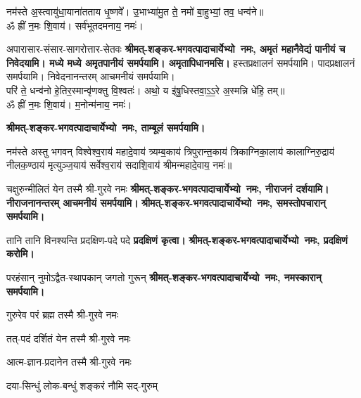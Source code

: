 \begin{center}

नम॑स्ते अ॒स्त्वायु॑धा॒याना॑तताय धृ॒ष्णवे᳚। उ॒भाभ्या॑मु॒त ते॒ नमो॑ बा॒हुभ्यां॒ तव॒ धन्व॑ने॥\\
ॐ ह्रीं न॒मः शि॒वाय॑। सर्व॑भूतदमनाय॒ नमः॑।

{अपारासार-संसार-सागरोत्तार-सेतवः}
\textbf{श्रीमत्-शङ्कर-भगवत्पादाचार्येभ्यो~नमः, अमृतं महानैवेद्यं पानीयं च निवेदयामि। मध्ये मध्ये अमृतपानीयं समर्पयामि। अमृतापिधानमसि।}
\medskip
हस्तप्रक्षालनं समर्पयामि। पादप्रक्षालनं समर्पयामि। निवेदनानन्तरम् आचमनीयं समर्पयामि।\\

परि॑ ते॒ धन्व॑नो हे॒तिर॒स्मान्वृ॑णक्तु वि॒श्वतः॑। अथो॒ य इ॑षु॒धिस्तवा॒ऽ॒ऽ॒रे अ॒स्मन्नि धे॑हि॒ तम्॥\\
ॐ ह्रीं न॒मः शि॒वाय॑। म॒नोन्म॑नाय॒ नमः॑।

\textbf{श्रीमत्-शङ्कर-भगवत्पादाचार्येभ्यो~नमः, ताम्बूलं समर्पयामि।}
\medskip

नम॑स्ते अस्तु भगवन् विश्वेश्व॒राय॑ महादे॒वाय॑ त्र्यम्ब॒काय॑ त्रिपुरान्त॒काय॑ त्रिकाग्निका॒लाय॑ कालाग्निरु॒द्राय॑ नीलक॒ण्ठाय॑ मृत्युञ्ज॒याय॑ सर्वेश्व॒राय॑ सदाशि॒वाय॑ श्रीमन्महादे॒वाय॒ नमः॑॥

{चक्षुरुन्मीलितं येन तस्मै श्री-गुरवे नमः}
\textbf{श्रीमत्-शङ्कर-भगवत्पादाचार्येभ्यो~नमः, नीराजनं दर्शयामि। नीराजनानन्तरम् आचमनीयं समर्पयामि।}
\medskip
\textbf{श्रीमत्-शङ्कर-भगवत्पादाचार्येभ्यो~नमः, समस्तोपचारान् समर्पयामि।}
\medskip

{तानि तानि विनश्यन्ति प्रदक्षिण-पदे पदे}
\textbf{प्रदक्षिणं कृत्वा।}
\medskip
\textbf{श्रीमत्-शङ्कर-भगवत्पादाचार्येभ्यो~नमः, प्रदक्षिणं करोमि।}
\medskip

{परहंसान् नुमोऽद्वैत-स्थापकान् जगतो गुरून्}
\textbf{श्रीमत्-शङ्कर-भगवत्पादाचार्येभ्यो~नमः, नमस्कारान् समर्पयामि।}
\medskip

{गुरुरेव परं ब्रह्म तस्मै श्री-गुरवे नमः}

{तत्-पदं दर्शितं येन तस्मै श्री-गुरवे नमः}

{आत्म-ज्ञान-प्रदानेन तस्मै श्री-गुरवे नमः}

{दया-सिन्धुं लोक-बन्धुं शङ्करं नौमि सद्-गुरुम्}


\end{center}
